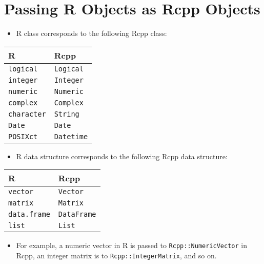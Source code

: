 \documentclass[
]{book}
\providecommand{\tightlist}{%
  \setlength{\itemsep}{0pt}\setlength{\parskip}{0pt}}
\begin{document}
\hypertarget{passing-r-objects-as-rcpp-objects}{%
\section{Passing R Objects as Rcpp Objects}\label{passing-r-objects-as-rcpp-objects}}

\begin{itemize}
\tightlist
\item
  R class corresponds to the following Rcpp class:
\end{itemize}

\begin{longtable}[]{@{}ll@{}}
\toprule\noalign{}
R & Rcpp \\
\midrule\noalign{}
\endhead
\bottomrule\noalign{}
\endlastfoot
\texttt{logical} & \texttt{Logical} \\
\texttt{integer} & \texttt{Integer} \\
\texttt{numeric} & \texttt{Numeric} \\
\texttt{complex} & \texttt{Complex} \\
\texttt{character} & \texttt{String} \\
\texttt{Date} & \texttt{Date} \\
\texttt{POSIXct} & \texttt{Datetime} \\
\end{longtable}

\begin{itemize}
\tightlist
\item
  R data structure corresponds to the following Rcpp data structure:
\end{itemize}

\begin{longtable}[]{@{}ll@{}}
\toprule\noalign{}
R & Rcpp \\
\midrule\noalign{}
\endhead
\bottomrule\noalign{}
\endlastfoot
\texttt{vector} & \texttt{Vector} \\
\texttt{matrix} & \texttt{Matrix} \\
\texttt{data.frame} & \texttt{DataFrame} \\
\texttt{list} & \texttt{List} \\
\end{longtable}

\begin{itemize}
\tightlist
\item
  For example, a numeric vector in R is passed to \texttt{Rcpp::NumericVector} in Rcpp, an integer matrix is to \texttt{Rcpp::IntegerMatrix}, and so on.
\end{itemize}
\end{document}
